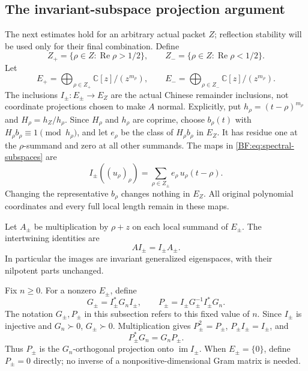 \subsection{The invariant-subspace projection argument}
\label{BF:projection-proof}

The next estimates hold for an arbitrary actual packet \(Z\);
reflection stability will be used only for their final combination.
Define
\[
Z_+=\{\rho\in Z:\operatorname{Re}\rho>1/2\},\qquad
Z_-=\{\rho\in Z:\operatorname{Re}\rho<1/2\}.
\]
Let
\begin{equation}
E_+=\bigoplus_{\rho\in Z_+}\mathbb C[z]/(z^{m_\rho}),
\qquad
E_-=\bigoplus_{\rho\in Z_-}\mathbb C[z]/(z^{m_\rho}).
\tag{BF.26}\label{BF:eq:spectral-subspaces}
\end{equation}
The inclusions \(I_\pm:E_\pm\to E_Z\) are the actual Chinese
remainder inclusions, not coordinate projections chosen to make
\(A\) normal.  Explicitly, put \(h_\rho=(t-\rho)^{m_\rho}\) and
\(H_\rho=h_Z/h_\rho\).  Since \(H_\rho\) and \(h_\rho\) are coprime,
choose \(b_\rho(t)\) with \(H_\rho b_\rho\equiv1\pmod{h_\rho}\),
and let \(e_\rho\) be the class of \(H_\rho b_\rho\) in \(E_Z\).
It has residue one at the \(\rho\)-summand and zero at all other
summands.  The maps in \eqref{BF:eq:spectral-subspaces} are
\[
I_\pm((u_\rho)_\rho)
 =\sum_{\rho\in Z_\pm}e_\rho\,u_\rho(t-\rho).
\]
Changing the representative \(b_\rho\) changes nothing in \(E_Z\).
All original polynomial coordinates and every full local length
remain in these maps.

Let \(A_\pm\) be multiplication by \(\rho+z\) on each local
summand of \(E_\pm\).  The intertwining identities are
\begin{equation}
AI_\pm=I_\pm A_\pm.
\tag{BF.27}\label{BF:eq:invariant-inclusions}
\end{equation}
In particular the images are invariant generalized eigenspaces, with
their nilpotent parts unchanged.

Fix \(n\ge0\).  For a nonzero \(E_\pm\), define
\begin{equation}
G_\pm=I_\pm^*G_nI_\pm,\qquad
P_\pm=I_\pm G_\pm^{-1}I_\pm^*G_n.
\tag{BF.28}\label{BF:eq:orthogonal-projections}
\end{equation}
The notation \(G_\pm,P_\pm\) in this subsection refers to this
fixed value of \(n\).
Since \(I_\pm\) is injective and \(G_n\succ0\), \(G_\pm\succ0\).
Multiplication gives \(P_\pm^2=P_\pm\),
\(P_\pm I_\pm=I_\pm\), and
\[
P_\pm^*G_n=G_nP_\pm.
\]
Thus \(P_\pm\) is the \(G_n\)-orthogonal projection onto
\(\operatorname{im}I_\pm\).  When \(E_\pm=\{0\}\), define
\(P_\pm=0\) directly; no inverse of a nonpositive-dimensional
Gram matrix is needed.


